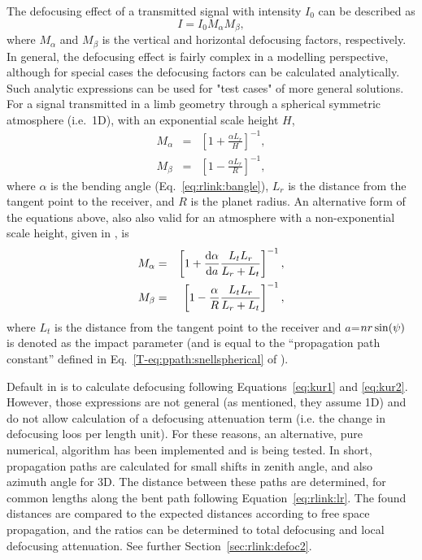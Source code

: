 The defocusing effect of a transmitted signal with intensity \(I_{0}\) can be
described as \citep{haugstad:78:turbu,kursinski:00:thegp}
\begin{equation}
\label{eq:foc1}
I=I_{0}M_{\alpha}M_{\beta},
\end{equation}
where \(M_{\alpha}\) and \(M_{\beta}\) is the vertical and horizontal
defocusing factors, respectively. In general, the defocusing effect is fairly
complex in a modelling perspective, although for special cases the defocusing
factors can be calculated analytically. Such analytic expressions can be used
for "test cases" of more general solutions. For a signal transmitted in a limb
geometry through a spherical symmetric atmosphere (i.e.\ 1D), with an
exponential scale height \(H\), \citep{haugstad:78:turbu}
\begin{eqnarray}
 M_{\alpha} &=& \left[1+\frac{\alpha L_{r}}{H} \right]^{-1}, \nonumber \\
 M_{\beta}  &=& \left[1-\frac{\alpha L_{r}}{R} \right]^{-1}, \nonumber
\end{eqnarray}
where \(\alpha\) is the bending angle (Eq.~\ref{eq:rlink:bangle}), \(L_{r}\) is
the distance from the tangent point to the receiver, and \(R\) is the planet
radius. An alternative form of the equations above, also
also valid for an atmosphere with a non-exponential scale height, given in
\citep{kursinski:00:thegp}, is
\begin{eqnarray}
 \label{eq:kur1}
 M_{\alpha} &=& \left[1+\frac{\mathrm{d} \alpha}{\mathrm{d} a} 
               \frac{{L_{t}L_{r}}}{L_{r}+L_{t}} \right]^{-1}, \\
\label{eq:kur2}
 M_{\beta} &=& \left[1-\frac{\alpha}{R}
              \frac{{L_{t}L_{r}}}{L_{r}+L_{t}} \right]^{-1},
\end{eqnarray}
where \(L_{t}\) is the distance from the tangent point to the receiver and
\(a\)=\(nr\sin(\psi)\) is denoted as the impact parameter (and is
equal to the ``propagation path constant'' defined in
Eq.~\ref{T-eq:ppath:snellspherical} of \theory).

Default in  is to calculate defocusing following
Equations~\ref{eq:kur1} and \ref{eq:kur2}. However, those expressions are not
general (as mentioned, they assume 1D) and do not allow calculation of a
defocusing attenuation term (i.e. the change in defocusing loos per length
unit). For these reasons, an alternative, pure numerical, algorithm has been
implemented and is being tested. In short, propagation paths are calculated for
small shifts in zenith angle, and also azimuth angle for 3D. The distance
between these paths are determined, for common lengths along the bent path
following Equation~\ref{eq:rlink:lr}. The found distances are compared to the
expected distances according to free space propagation, and the ratios can be
determined to total defocusing and local defocusing attenuation. See further
Section~\ref{sec:rlink:defoc2}.




